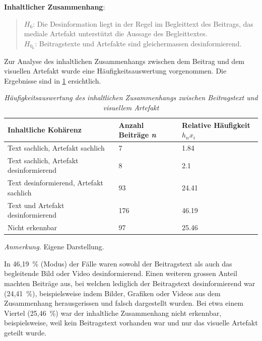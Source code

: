 \documentclass[12pt,a4paper]{article}        %
\begin{document}
\textbf{Inhaltlicher Zusammenhang}:
\begin{quote}
  \(H_6\): Die Desinformation liegt in der Regel im Begleittext des Beitrags, das mediale Artefakt unterstützt die Aussage des Begleittextes. \\
  \(H_{0_6}\): Beitragstexte und Artefakte sind gleichermassen desinformierend.
\end{quote}
Zur Analyse des inhaltlichen Zusammenhangs zwischen dem Beitrag und dem visuellen Artefakt wurde eine Häufigkeitsauswertung vorgenommen. Die Ergebnisse sind in \ref{tab:results_visual_coherence_table} ersichtlich.

\begin{table}[H]
\caption{\textit{Häufigkeitsauswertung des inhaltlichen Zusammenhangs zwischen Beitragstext und visuellem Artefakt}}
\label{tab:results_visual_coherence_table}
    \centering
    \begin{tabular}{|l|l|l|}\hline
         \textbf{Inhaltliche Kohärenz}&  \textbf{Anzahl Beiträge \textit{n}}& \textbf{Relative Häufigkeit \({h_n}{x_i}\)}\\\hline
         Text sachlich, Artefakt sachlich&  7& 1.84\\\hline
         Text sachlich, Artefakt desinformierend&  8& 2.1\\\hline
         Text desinformierend, Artefakt sachlich&  93& 24.41\\\hline
         Text und Artefakt desinformierend&  176& 46.19\\\hline
         Nicht erkennbar&  97& 25.46\\ \hline
    \end{tabular}
    \footnotesize\textit{Anmerkung.} Eigene Darstellung.
\end{table}
In 46,19 \% (Modus) der Fälle waren sowohl der Beitragstext als auch das begleitende Bild oder Video desinformierend. Einen weiteren grossen Anteil machten Beiträge aus, bei welchen lediglich der Beitragstext desinformierend war (24,41 \%), beispielsweise indem Bilder, Grafiken oder Videos aus dem Zusammenhang herausgerissen und falsch dargestellt wurden. Bei etwa einem Viertel (25,46 \%) war der inhaltliche Zusammenhang nicht erkennbar, beispielsweise, weil kein Beitragstext vorhanden war und nur das visuelle Artefakt geteilt wurde.
\end{document}

